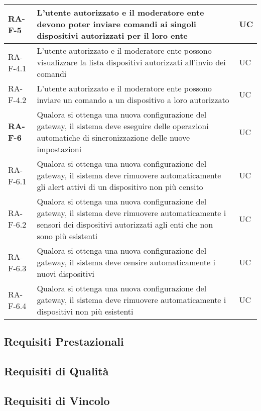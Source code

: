 \begin{center}
\begin{longtable}{|p{3cm}|p{9.85cm}|p{2cm}|}
		\rowcolor{redroundrobin}
		\textbf{RA-F-5} & L'utente autorizzato e il moderatore ente devono poter inviare comandi ai singoli dispositivi autorizzati per il loro ente & UC \\ \hline
		{\color{gray} RA-F-}4.1 & L'utente autorizzato e il moderatore ente possono visualizzare la lista dispositivi autorizzati all'invio dei comandi & UC \\ \hline
		{\color{gray} RA-F-}4.2 & L'utente autorizzato e il moderatore ente possono inviare un comando a un dispositivo a loro autorizzato & UC \\ \hline

		\rowcolor{redroundrobin}
		\textbf{RA-F-6} & Qualora si ottenga una nuova configurazione del gateway, il sistema deve eseguire delle operazioni automatiche di sincronizzazione delle nuove impostazioni & UC \\ \hline
		{\color{gray} RA-F-}6.1 & Qualora si ottenga una nuova configurazione del gateway, il sistema deve rimuovere automaticamente gli alert attivi di un dispositivo non più censito  & UC \\ \hline
		{\color{gray} RA-F-}6.2 & Qualora si ottenga una nuova configurazione del gateway, il sistema deve rimuovere automaticamente i sensori dei dispositivi autorizzati agli enti che non sono più esistenti & UC \\ \hline
		{\color{gray} RA-F-}6.3 & Qualora si ottenga una nuova configurazione del gateway, il sistema deve censire automaticamente i nuovi dispositivi & UC \\ \hline
		{\color{gray} RA-F-}6.4 & Qualora si ottenga una nuova configurazione del gateway, il sistema deve rimuovere automaticamente i dispositivi non più esistenti & UC \\ \hline


		\end{longtable}
	\end{center}

	\subsection{Requisiti Prestazionali}
	\subsection{Requisiti di Qualità}
	\subsection{Requisiti di Vincolo}